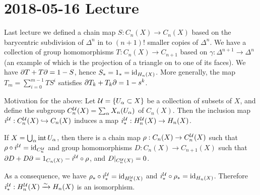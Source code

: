 \section{2018-05-16 Lecture}

Last lecture we defined a chain map $S: C_n(X) \to C_n(X)$ based on the barycentric subdivision of $\Delta^n$ in to $(n+1)!$ smaller copies of $\Delta^n$.
We have a collection of group homomorphisms $T: C_n(X) \to C_{n+1}$ based on $\gamma: \Delta^{n+1} \to \Delta^n$ (an example of which is the projection of a triangle on to one of its faces).
We have $\partial T+T\partial = 1-S$, hence $S_*=1_*=\operatorname{id}_{H_n(X)}$.
More generally, the map $T_m = \sum_{i=0}^{m-1} TS^i$ satisfies $\partial T_k+T_k\partial = 1-s^k$.

Motivation for the above:
Let $\mathcal{U} = \{ U_\alpha \subset X\}$ be a collection of subsets of $X$, and define the subgroup $C_n^{\mathcal{U}}(X) = \sum_\alpha X_n(U_\alpha)$ of $C_n(X)$.
Then the inclusion map $i^{\mathcal{U}}: C_n^{\mathcal{U}}(X) \hookrightarrow C_n(X)$ induces a map $i_*^{\mathcal{U}}: H_n^{\mathcal{U}}(X) \to H_n(X)$.

\begin{prop}
  If $X = \bigcup_\alpha \operatorname{int} U_\alpha$, then there is a chain map $\rho:C_n(X) \to C_n^{\mathcal{U}}(X)$ such that $\rho \circ i^{\mathcal{U}} = \operatorname{id}_{C_n^{\mathcal{U}}}$ and group homomorphisms $D: C_n(X) \to C_{n+1}(X)$ such that $\partial D+D\partial = 1_{C_n(X)} - i^{\mathcal{U}} \circ \rho$, and $D|_{C_n^{\mathcal{U}}(X)}=0$.
\end{prop}

\begin{cor}
  As a consequence, we have $\rho_* \circ i_*^{\mathcal{U}} = \operatorname{id}_{H_n^{\mathcal{U}}(X)}$ and $i_*^{\mathcal{U}} \circ \rho_* = \operatorname{id}_{H_n(X)}$.
  Therefore $i_*^{\mathcal{U}}: H_n^{\mathcal{U}}(X) \xrightarrow{\sim} H_n(X)$ is an isomorphism.
\end{cor}

